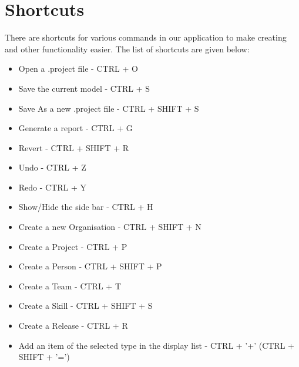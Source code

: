 \section{Shortcuts}

There are shortcuts for various commands in our application to make creating and other functionality easier. The list of shortcuts are given below:

\begin{itemize}
\item Open a .project file - CTRL + O
\item Save the current model - CTRL + S
\item Save As a new .project file - CTRL + SHIFT + S
\item Generate a report - CTRL + G
\item Revert - CTRL + SHIFT + R
\item Undo - CTRL + Z
\item Redo - CTRL + Y
\item Show/Hide the side bar - CTRL + H
\item Create a new Organisation - CTRL + SHIFT + N
\item Create a Project - CTRL + P
\item Create a Person - CTRL + SHIFT + P
\item Create a Team - CTRL + T
\item Create a Skill - CTRL + SHIFT + S
\item Create a Release - CTRL + R
\item Add an item of the selected type in the display list - CTRL + '+' (CTRL + SHIFT + '=')
\end{itemize}